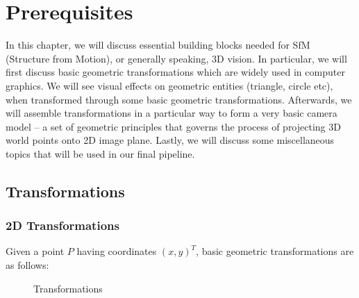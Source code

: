 \documentclass{book}
\begin{document}
    \chapter{Prerequisites}
        In this chapter, we will discuss essential building blocks needed for SfM (Structure from Motion), or generally speaking, 3D vision.
        In particular, we will first discuss basic geometric transformations which are widely used in computer graphics. We will see visual
        effects on geometric entities (triangle, circle etc), when transformed through some basic geometric transformations. Afterwards, we 
        will assemble transformations in a particular way to form a very basic camera model -- a set of geometric principles that governs the
        process of projecting 3D world points onto 2D image plane. Lastly, we will discuss some miscellaneous topics that will be used in 
        our final pipeline. 

        \section{Transformations} \label{sec_2dtrans}
            
            \subsection{2D Transformations} 
                Given a point $P$ having coordinates $(x,y)^{T}$, basic geometric transformations are as follows:

                \begin{figure}[!ht]%
                    \centering
                    \qquad
                    \qquad
                    \caption{Transformations}%
                    \label{fig_transformations}%
                \end{figure}
\end{document}
